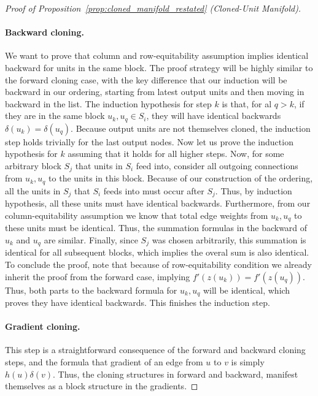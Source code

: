 \documentclass{article}
\numberwithin{figure}{section}
\begin{document}
\begin{proof}[Proof of Proposition~\ref{prop:cloned_manifold_restated} (Cloned-Unit Manifold)]
\paragraph{‌Backward cloning.} We want to prove that column and row-equitability assumption implies identical backward for units in the same block. The  proof strategy will be highly similar to the forward cloning case, with the key difference that our induction will be backward in our ordering, starting from latest output units and then moving in backward in the list. The induction hypothesis for step $k$ is that, for al $q > k$, if they are in the same block $u_k,u_q\in S_i$, they will have identical backwards $\delta(u_k)=\delta(u_q).$ Because output units are not themselves cloned, the induction step holds trivially for the last output nodes. Now let us prove the induction hypothesis for $k$ assuming that it holds for all higher steps. Now, for some arbitrary block $S_j$ that units in $S_i$ feed into, consider all outgoing connections from $u_k,u_q$ to the units in this block. Because of our construction of the ordering, all the units in $S_j$ that $S_i$ feeds into must occur after $S_j.$ Thus, by induction hypothesis, all these units must have identical backwards. Furthermore, from our column-equitability assumption we know that total edge weights from $u_k,u_q$ to these units must be identical. Thus, the summation formulas in the backward of $u_k$ and $u_q$ are similar. Finally, since $S_j$ was chosen arbitrarily, this summation is identical for all subsequent blocks, which implies the overal sum is also identical. To conclude the proof, note that because of row-equitability condition we already inherit the proof from the forward case, implying  $f'(z(u_k)) = f'(z(u_q)). $ Thus, both parts to the backward formula for $u_k,u_q$ will be identical, which proves they have identical backwards. This finishes the induction step. 

\paragraph{Gradient cloning.} This step is a straightforward consequence of the forward and backward cloning steps, and the formula that gradient of an edge from $u$ to $v$ is simply $h(u)\delta(v).$ Thus, the cloning structures in forward and backward, manifest themselves as a block structure in the gradients. 


\end{proof}
\end{document}
